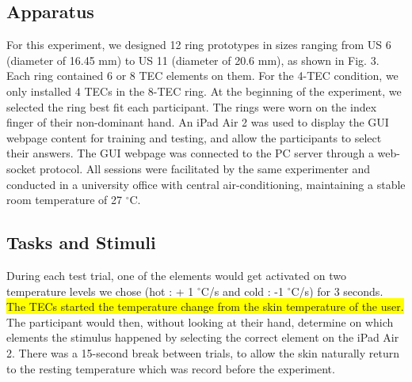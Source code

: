 \documentclass[preprint,12pt]{elsarticle}
\begin{document}
\subsection{Apparatus}
For this experiment, we designed 12 ring prototypes in sizes ranging from US 6 (diameter of 16.45 mm) to US 11 (diameter of 20.6 mm), as shown in Fig. 3. Each ring contained 6 or 8 TEC elements on them. For the 4-TEC condition, we only installed 4 TECs in the 8-TEC ring. At the beginning of the experiment, we selected the ring best fit each participant. The rings were worn on the index finger of their non-dominant hand. An iPad Air 2 was used to display the GUI webpage content for training and testing, and allow the participants to select their answers. The GUI webpage was connected to the PC server through a web-socket protocol. All sessions were facilitated by the same experimenter and conducted in a university office with central air-conditioning, maintaining a stable room temperature of 27 $^{\circ}$C.

\subsection{Tasks and Stimuli}
During each test trial, one of the elements would get activated on two temperature levels we chose (hot : + 1 $^{\circ}$C/s and cold : -1 $^{\circ}$C/s) for 3 seconds. \colorbox{yellow}{The TECs started the temperature change from the skin temperature of the user.} The participant would then, without looking at their hand, determine on which elements the stimulus happened by selecting the correct element on the iPad Air 2. There was a 15-second  break between trials, to allow the skin naturally return to the resting temperature which was record before the experiment.
\end{document}

